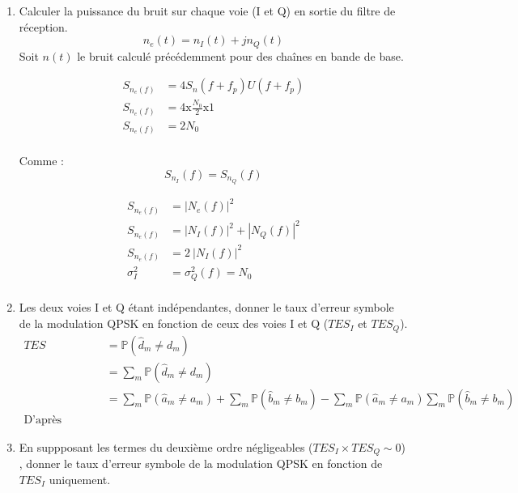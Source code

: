 \documentclass[frenchb]{article}
\begin{document}
\begin{enumerate}
        

    
    \item Calculer la puissance du bruit sur chaque voie (I et Q) en sortie du filtre de réception.
    $$ n_e(t) = n_I(t) + j n_Q(t) $$
    Soit $n(t)$ le bruit calculé précédemment pour des chaînes en bande de base. 
    
    \begin{equation*}
    \begin{split}
    S_{n_e(f)} & = 4 S_n(f+f_p) U(f+f_p) \\
    S_{n_e(f)} & = 4 \text{x} \frac{N_0}{2} \text{x} 1 \\
    S_{n_e(f)} & = 2 N_0 \\
    \end{split}
    \end{equation*}
    
    Comme : 
    $$ S_{n_I}(f) = S_{n_Q}(f) $$
    
    \begin{equation*}
    \begin{split}
    S_{n_e(f)} & = |N_e(f)|^2 \\
    S_{n_e(f)} & = |N_I(f)|^2 + |N_Q(f)|^2\\
    S_{n_e(f)} & = 2 \ |N_I(f)|^2 \\
    \sigma_I^2 & = \sigma_Q^2(f) = N_0 \\
    \end{split}
    \end{equation*}
    
    \item Les deux voies I et Q étant indépendantes, donner le taux d'erreur symbole de la modulation QPSK en fonction de ceux des voies I et Q ($TES_I$ et $TES_Q$).
    \begin{equation*}
    \begin{split}
    TES & = \mathbb{P}(\hat{d}_m \ne d_m) \\
    & = \sum_{m} \mathbb{P}(\hat{d}_m \ne d_m) \\
    & = \sum_{m} \mathbb{P}(\hat{a}_m \ne a_m) + \sum_{m} \mathbb{P}(\hat{b}_m \ne b_m) - \sum_{m} \mathbb{P}(\hat{a}_m \ne a_m) \sum_{m} \mathbb{P}(\hat{b}_m \ne b_m)\\ \text{D'après l'indépendance des deux voies.}
    \end{split}
    \end{equation*}
           
    \item En suppposant les termes du deuxième ordre négligeables ($TES_I \times TES_Q \sim 0$) , donner le taux d'erreur symbole de la modulation QPSK en fonction de $TES_I$ uniquement.
    

\end{enumerate}
\end{document}
